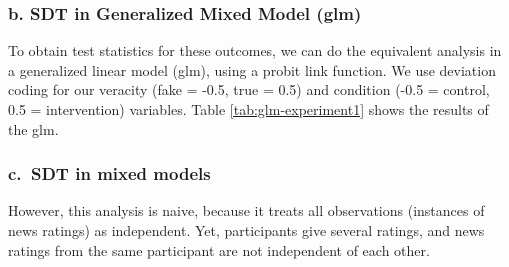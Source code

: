 \documentclass[
  man,mask,floatsintext]{apa6}
\begin{document}
\subsubsection{b. SDT in Generalized Mixed Model (glm)}\label{b.-sdt-in-generalized-mixed-model-glm}

To obtain test statistics for these outcomes, we can do the equivalent analysis in a generalized linear model (glm), using a probit link function. We use deviation coding for our veracity (fake = -0.5, true = 0.5) and condition (-0.5 = control, 0.5 = intervention) variables. Table \ref{tab:glm-experiment1} shows the results of the glm.

\begin{table}
\centering
\caption{\label{tab:glm-experiment1}Summary of glm results for Experiment 1 of simulated data}
\centering
{}
\end{table}

\subsubsection{c.~SDT in mixed models}\label{c.-sdt-in-mixed-models}

However, this analysis is naive, because it treats all observations (instances of news ratings) as independent. Yet, participants give several ratings, and news ratings from the same participant are not independent of each other.
\end{document}
